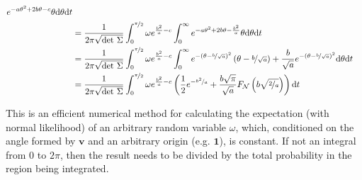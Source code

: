 \documentclass{article}
\begin{document}
\begin{equation*}
\begin{aligned}
    e^{
      -a \theta^2
      + 2b \theta
      -c
    }
    \theta
    \text{d}\theta
    \text{d}t
    \\
    &=
    \frac{1}{2\pi \sqrt{\text{det }\Sigma}}
    \int_0^{\nicefrac{\pi}{2}}
    \omega
    e^{\frac{b^2}{a}-c}
    \int_0^\infty
    e^{
      -a \theta^2
      + 2b \theta
      - \frac{b^2}{a}
    }
    \theta
    \text{d}\theta
    \text{d}t
    \\
    &=
    \frac{1}{2\pi \sqrt{\text{det }\Sigma}}
    \int_0^{\nicefrac{\pi}{2}}
    \omega
    e^{\frac{b^2}{a}-c}
    \int_0^\infty
    e^{-(\theta-\nicefrac{b}{\sqrt{a}})^2}
    \left(\theta - \nicefrac{b}{\sqrt{a}}\right)
    +
    \frac{b}{\sqrt{a}} e^{-(\theta-\nicefrac{b}{\sqrt{a}})^2}
    \text{d}\theta
    \text{d}t
    \\
    &=
    \frac{1}{2\pi \sqrt{\text{det }\Sigma}}
    \int_0^{\nicefrac{\pi}{2}}
    \omega
    e^{\frac{b^2}{a}-c}
    \left(
      \frac{1}{2} e^{-\nicefrac{b^2}{a}}
      +
      \frac{b\sqrt{\pi}}{\sqrt{a}}
      F_{\mathcal{N}}\left(b \sqrt{\nicefrac{2}{a}}\right)
    \right)
    \text{d}t
  \end{aligned}
\end{equation*}

This is an efficient numerical method for calculating the expectation (with
normal likelihood) of an arbitrary random variable $\omega$, which, conditioned
on the angle formed by $\mathbf{v}$ and an arbitrary origin (e.g. $\mathbf{1}$),
is constant. If not an integral from $0$ to $2\pi$, then the result needs to be
divided by the total probability in the region being integrated.
\end{document}
